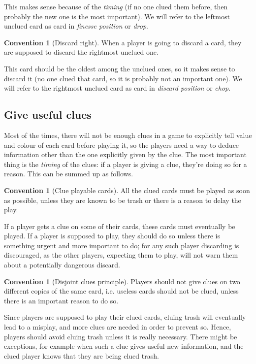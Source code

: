\documentclass[a4paper]{article}
\theoremstyle{plain}
\theoremstyle{definition}
\newtheorem{convention}[theorem]{Convention}
\begin{document}
This makes sense because of the \emph{timing} (if no one clued them before, then probably the new one is the most important). We will refer to the leftmost unclued card as card in \emph{finesse position} or \emph{drop}.

\begin{convention}[Discard right]
	\label{discard-right}
	When a player is going to discard a card, they are supposed to discard the rightmost unclued one.
\end{convention}

This card should be the oldest among the unclued ones, so it makes sense to discard it (no one clued that card, so it is probably not an important one). We will refer to the rightmost unclued card as card in \emph{discard position} or \emph{chop}.

\subsection{Give useful clues}

Most of the times, there will not be enough clues in a game to explicitly tell value and colour of each card before playing it, so the players need a way to deduce information other than the one explicitly given by the clue. The most important thing is the \emph{timing} of the clues: if a player is giving a clue, they're doing so for a reason. This can be summed up as follows.

\begin{convention}[Clue playable cards]
	\label{clue-playable-cards}
	All the clued cards must be played as soon as possible, unless they are known to be trash or there is a reason to delay the play.
\end{convention}

If a player gets a clue on some of their cards, these cards must eventually be played. If a player is supposed to play, they should do so unless there is something urgent and more important to do; for any such player discarding is discouraged, as the other players, expecting them to play, will not warn them about a potentially dangerous discard.

\begin{convention}[Disjoint clues principle]
	\label{disjoint-clues}
	Players should not give clues on two different copies of the same card, i.e. useless cards should not be clued, unless there is an important reason to do so.
\end{convention}

Since players are supposed to play their clued cards, cluing trash will eventually lead to a misplay, and more clues are needed in order to prevent so. Hence, players should avoid cluing trash unless it is really necessary. There might be exceptions, for example when such a clue gives useful new information, and the clued player knows that they are being clued trash.
\end{document}
